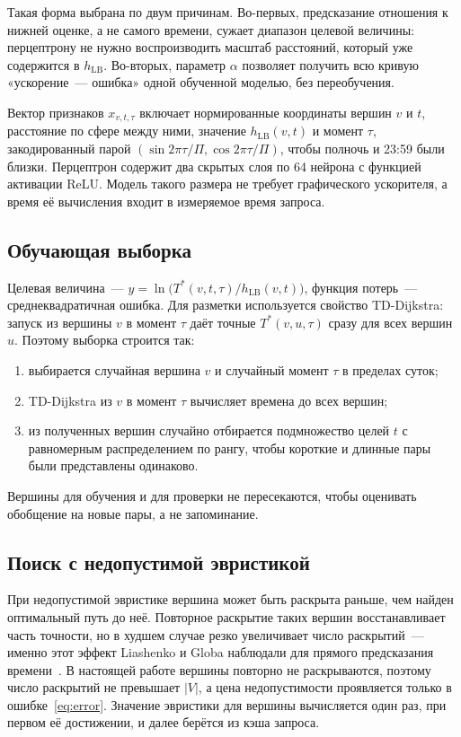 \documentclass{misisarticle}
\begin{document}
Такая форма выбрана по двум причинам. Во-первых, предсказание отношения к нижней оценке, а не самого времени, сужает диапазон целевой величины: перцептрону не нужно воспроизводить масштаб расстояний, который уже содержится в $h_{\mathrm{LB}}$. Во-вторых, параметр $\alpha$ позволяет получить всю кривую «ускорение~--- ошибка» одной обученной моделью, без переобучения.

Вектор признаков $x_{v,t,\tau}$ включает нормированные координаты вершин $v$ и $t$, расстояние по сфере между ними, значение $h_{\mathrm{LB}}(v, t)$ и момент $\tau$, закодированный парой $(\sin 2\pi\tau/\Pi, \cos 2\pi\tau/\Pi)$, чтобы полночь и 23:59 были близки. Перцептрон содержит два скрытых слоя по 64 нейрона с функцией активации ReLU. Модель такого размера не требует графического ускорителя, а время её вычисления входит в измеряемое время запроса.

\subsection{Обучающая выборка}

Целевая величина~--- $y = \ln\bigl(T^*(v, t, \tau) / h_{\mathrm{LB}}(v, t)\bigr)$, функция потерь~--- среднеквадратичная ошибка. Для разметки используется свойство TD-Dijkstra: запуск из вершины $v$ в момент $\tau$ даёт точные $T^*(v, u, \tau)$ сразу для всех вершин $u$. Поэтому выборка строится так:
\begin{enumerate}
  \item выбирается случайная вершина $v$ и случайный момент $\tau$ в пределах суток;
  \item TD-Dijkstra из $v$ в момент $\tau$ вычисляет времена до всех вершин;
  \item из полученных вершин случайно отбирается подмножество целей $t$ с равномерным распределением по рангу, чтобы короткие и длинные пары были представлены одинаково.
\end{enumerate}
Вершины для обучения и для проверки не пересекаются, чтобы оценивать обобщение на новые пары, а не запоминание.

\subsection{Поиск с недопустимой эвристикой}

При недопустимой эвристике вершина может быть раскрыта раньше, чем найден оптимальный путь до неё. Повторное раскрытие таких вершин восстанавливает часть точности, но в худшем случае резко увеличивает число раскрытий~--- именно этот эффект Liashenko и Globa наблюдали для прямого предсказания времени~\cite{liashenko2026}. В настоящей работе вершины повторно не раскрываются, поэтому число раскрытий не превышает $|V|$, а цена недопустимости проявляется только в ошибке~\eqref{eq:error}. Значение эвристики для вершины вычисляется один раз, при первом её достижении, и далее берётся из кэша запроса.
\end{document}

